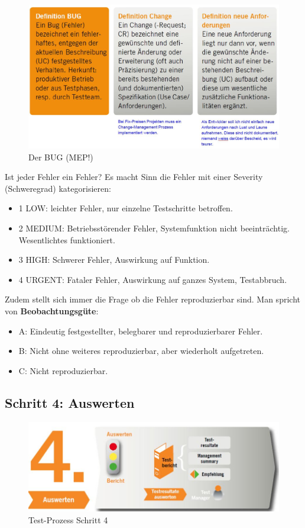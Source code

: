 \begin{figure}[h!]
\centering
\includegraphics[width=0.7\linewidth]{fig/der-bug}
\caption{Der BUG (MEP!)}
\label{fig:der-bug}
\end{figure}

Ist jeder Fehler ein Fehler? Es macht Sinn die Fehler mit einer Severity (Schweregrad) kategorisieren:
\begin{itemize}
	\item 1 LOW: leichter Fehler, nur einzelne Testschritte betroffen.
	\item 2 MEDIUM: Betriebsstörender Fehler, Systemfunktion nicht beeinträchtig. Wesentlichtes funktioniert.
	\item 3 HIGH: Schwerer Fehler, Auswirkung auf Funktion.
	\item 4 URGENT: Fataler Fehler, Auswirkung auf ganzes System, Testabbruch.
\end{itemize}

Zudem stellt sich immer die Frage ob die Fehler reproduzierbar sind. Man spricht von \textbf{Beobachtungsgüte}:
\begin{itemize}
	\item A: Eindeutig festgestellter, belegbarer und reproduzierbarer Fehler.
	\item B: Nicht ohne weiteres reproduzierbar, aber wiederholt aufgetreten.
	\item C: Nicht reproduzierbar.	
\end{itemize}

\subsection{Schritt 4: Auswerten}

\begin{figure}[h!]
	\centering
	\includegraphics[width=0.7\linewidth]{fig/test-prozess-schritt-4}
	\caption{Test-Prozess Schritt 4}
	\label{fig:test-prozess-schritt-4}
\end{figure}

